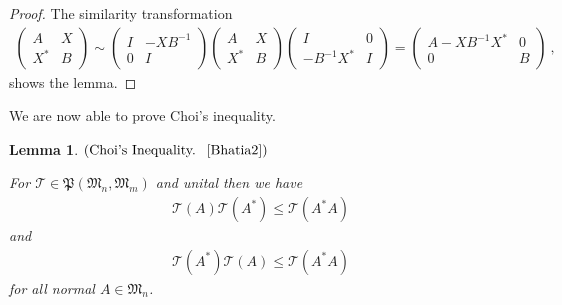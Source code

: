 \documentclass[a4paper
               ,12pt
               ,DIV=12
               ,oneside
               ]
               {amsart}
\theoremstyle{plain}
\newtheorem{lem}{Lemma}
\theoremstyle{remark}
\def\lb{\left(}
\def\rb{\right)}
\newcommand\M{\mathfrak{M}}
\newcommand{\Tm}{\mathcal{T}}
\begin{document}
\begin{proof}

The similarity transformation 
\begin{align*}
\begin{pmatrix} A & X \\ X^{*} & B \end{pmatrix} \sim \begin{pmatrix} I & -XB^{-1} \\ 0 & I \end{pmatrix}\begin{pmatrix} A & X \\ X^{*} & B \end{pmatrix}\begin{pmatrix} I & 0 \\ -B^{-1}X^{*} & I \end{pmatrix}=\begin{pmatrix} A-XB^{-1}X^{*} & 0 \\ 0 & B \end{pmatrix}\medspace,
\end{align*}
shows the lemma.

\end{proof}

We are now able to prove Choi's inequality.

\begin{lem}$\lb\text{Choi's Inequality. ~\cite{Bhatia2}}\rb$

For $\Tm\in\mathfrak{P}\lb \M_n,\M_m\rb$ and unital then we have
\begin{align*}
\Tm\lb A\rb \Tm\lb A^{*}\rb \leq \Tm\lb A^{*}A\rb 
\end{align*} 
and
\begin{align*}
\Tm\lb A^{*}\rb\Tm\lb A\rb \leq \Tm\lb A^{*}A\rb 
\end{align*} 
for all normal $A\in\M_n$.
\label{lem:ChoiInequ}
\end{lem}
\end{document}

